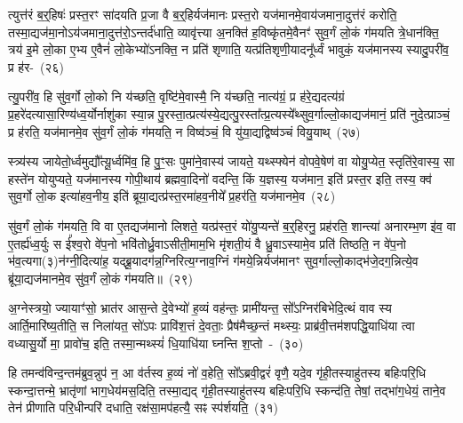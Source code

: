 त्युत्त॑रं ब॒र्॒\mbox{}हिषः॑ प्रस्त॒रꣳ सा॑दयति प्र॒जा वै ब॒र्॒\mbox{}हिर्यज॑मानः प्रस्त॒रो यज॑मानमे॒वाय॑जमाना॒दुत्त॑रं करोति॒ तस्मा॒द्यज॑मा॒नो\-ऽय॑जमाना॒दुत्त॑रो॒\-ऽन्तर्द॑धाति॒ व्यावृ॑त्त्या अ॒नक्ति॑ ह॒विष्कृ॑तमे॒वैनꣳ॑ सुव॒र्गं लो॒कं ग॑मयति त्रे॒धान॑क्ति॒ त्रय॑ इ॒मे लो॒का ए॒भ्य ए॒वैनं॑ लो॒केभ्यो॑\-ऽनक्ति॒ न प्रति॑ शृणाति॒ यत्प्र॑तिशृणी॒यादनू᳚र्ध्वं भावुकं॒ यज॑मानस्य स्यादु॒परी॑व॒ प्र ह॑र-~(२६)

त्यु॒परी॑व॒ हि सु॑व॒र्गो लो॒को नि य॑च्छति॒ वृष्टि॑मे॒वास्मै॒ नि य॑च्छति॒ नात्य॑ग्रं॒ प्र ह॑रे॒द्यदत्य॑ग्रं प्र॒हरे॑दत्यासा॒रिण्य॑ध्व॒र्यो\-र्नाशु॑का स्या॒न्न पु॒रस्ता॒त्प्रत्य॑स्ये॒द्यत्पु॒रस्ता᳚त्प्र॒त्यस्ये᳚थ्सुव॒र्गाल्लो॒काद्यज॑मानं॒ प्रति॑ नुदे॒त्प्राञ्चं॒ प्र ह॑रति॒ यज॑मानमे॒व सु॑व॒र्गं लो॒कं ग॑मयति॒ न विष्व॑ञ्चं॒ वि यु॑या॒द्यद्विष्व॑ञ्चं वियु॒याथ्~(२७)

स्त्र्य॑स्य जायेतो॒र्ध्वमुद्यौ᳚त्यू॒र्ध्वमि॑व॒ हि पु॒ꣳ॒सः पुमा॑ने॒वास्य॑ जायते॒ यथ्स्फ्येन॑ वोपवे॒षेण॑ वा योयु॒प्येत॒ स्तृति॑रे॒वास्य॒ सा हस्ते॑न योयुप्यते॒ यज॑मानस्य गोपी॒थाय॑ ब्रह्मवा॒दिनो॑ वदन्ति॒ किं य॒ज्ञस्य॒ यज॑मान॒ इति॑ प्रस्त॒र इति॒ तस्य॒ क्व॑ सुव॒र्गो लो॒क इत्या॑हव॒नीय॒ इति॑ ब्रूया॒द्यत्प्र॑स्त॒रमा॑हव॒नीये᳚ प्र॒हर॑ति॒ यज॑मानमे॒व~(२८)

सु॑व॒र्गं लो॒कं ग॑मयति॒ वि वा ए॒तद्यज॑मानो लिशते॒ यत्प्र॑स्त॒रं यो॑यु॒प्यन्ते॑ ब॒र्॒\mbox{}हिरनु॒ प्रह॑रति॒ शान्त्या॑ अनारम्भ॒ण इ॑व॒ वा ए॒तर्\mbox{}ह्य॑ध्व॒र्युः स ई᳚श्व॒रो वे॑प॒नो भवि॑तोर्ध्रु॒वा\-ऽसीती॒माम॒भि मृ॑शती॒यं वै ध्रु॒वा\-ऽस्यामे॒व प्रति॑ तिष्ठति॒ न वे॑प॒नो भ॑व॒त्यगा(३)न॑ग्नी॒दित्या॑ह॒ यद्ब्रू॒यादग॑न्न॒ग्निरित्य॒ग्नाव॒ग्निं ग॑मये॒न्निर्यज॑मानꣳ सुव॒र्गाल्लो॒काद्भ॑जे॒द\-ग॒न्नित्ये॒व ब्रू॑या॒द्यज॑मानमे॒व सु॑व॒र्गं लो॒कं ग॑मयति॥~(२९)

{\anuvakamend[{आ॒साद्य॒ प्रान॑तिदृश्ञं करोति हरति वियु॒याद्यज॑मानमे॒वाग्निरिति॑ स॒प्तद॑श च}]}%

अ॒ग्नेस्त्रयो॒ ज्यायाꣳ॑सो॒ भ्रात॑र आस॒न्ते दे॒वेभ्यो॑ ह॒व्यं वह॑न्तः॒ प्रामी॑यन्त॒ सो᳚\-ऽग्निर॑बिभेदि॒त्थं वाव स्य आर्ति॒मारि॑ष्य॒तीति॒ स निला॑यत॒ सो॑\-ऽपः प्रावि॑श॒त्तं दे॒वताः॒ प्रैष॑मैच्छ॒न्तं मथ्स्यः॒ प्राब्र॑वी॒त्तम॑शपद्धि॒याधि॑या त्वा वध्यासु॒र्यो मा॒ प्रावो॑च॒ इति॒ तस्मा॒न्मथ्स्यं॑ धि॒याधि॑या घ्नन्ति श॒प्तो~-~(३०)

हि तमन्व॑विन्द॒न्तम॑ब्रुव॒न्नुप॑ न॒ आ व॑र्तस्व ह॒व्यं नो॑ व॒हेति॒ सो᳚\-ऽब्रवी॒द्वरं॑ वृणै॒ यदे॒व गृ॑ही॒तस्याहु॑तस्य बहिःपरि॒धि स्कन्दा॒त्तन्मे॒ भ्रातृ॑णां भाग॒धेय॑मस॒दिति॒ तस्मा॒द्यद् गृ॑ही॒तस्याहु॑तस्य बहिःपरि॒धि स्कन्द॑ति॒ तेषां॒ तद्भा॑ग॒धेयं॒ ताने॒व तेन॑ प्रीणाति परि॒धीन्परि॑ दधाति॒ रक्ष॑सा॒मप॑हत्यै॒ सꣴ स्प॑र्\mbox{}शयति॒~(३१)

